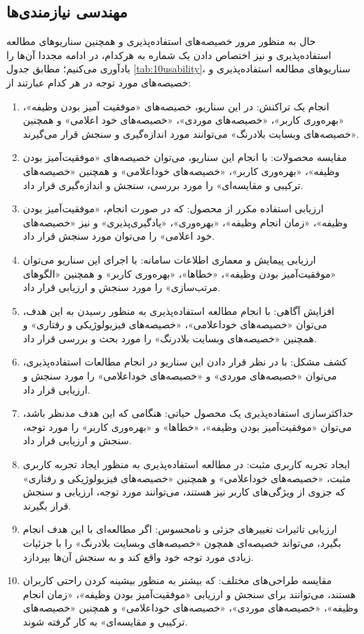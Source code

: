 \subsection{مهندسی نیازمندی‌ها}
حال به منظور مرور خصیصه‌های استفاده‌پذیری  و همچنین سناریوهای مطالعه استفاده‌پذیری و نیز اختصاص دادن یک شماره به هرکدام، در ادامه مجددا آن‌ها را یادآوری می‌کنیم؛ مطابق جدول
\ref{tab:10usability}،
سناریو‌های مطالعه استفاده‌پذیری و خصیصه‌های مورد توجه در هر کدام عبارتند از:
\begin{enumerate}
	\item
	انجام یک تراکنش: در این سناریو، خصیصه‌های «موفقیت آمیز بودن وظیفه»، «بهره‌وری کاربر»، «خصیصه‌های موردی»، «خصیصه‌های خود اعلامی» و همچنین «خصیصه‌های وبسایت بلادرنگ» می‌توانند مورد اندازه‌گیری و سنجش قرار می‌گیرند.
	\item
	مقایسه محصولات: با انجام این سناریو، می‌توان خصیصه‌های «موفقیت‌آمیز بودن وظیفه»، «بهره‌وری کاربر»، «خصیصه‌های خوداعلامی» و همچنین «خصیصه‌های ترکیبی و مقایسه‌ای» را مورد بررسی، سنجش و اندازه‌گیری قرار داد.
	\item
	ارزیابی استفاده مکرر از محصول: که در صورت انجام، «موفقیت‌آمیز بودن وظیفه»، «زمان انجام وظیفه»، «بهره‌وری»، «یادگیری‌پذیری» و نیز «خصیصه‌های خود اعلامی» را می‌توان مورد سنجش قرار داد.
	\item
	ارزیابی پیمایش و معماری اطلاعات سامانه: با اجرای این سناریو می‌توان «موفقیت‌آمیز بودن وظیفه»، «خطاها»، «بهره‌وری کاربر» و همچنین «الگوهای مرتب‌سازی» را مورد سنجش و ارزیابی قرار داد.
	\item
	افزایش آگاهی: با انجام مطالعه استفاده‌پذیری به منظور رسیدن به این هدف، می‌توان «خصیصه‌های خوداعلامی»، «خصیصه‌های فیزیولوژیکی و رفتاری» و همچنین «خصیصه‌های وبسایت‌ بلادرنگ» را مورد بحث و بررسی قرار داد.
	\item
	کشف مشکل: با در نظر قرار دادن این سناریو در انجام مطالعات استفاده‌پذیری، می‌توان «خصیصه‌های موردی» و «خصیصه‌های خوداعلامی» را مورد سنجش و ارزیابی قرار داد.
	\item 
	حداکثرسازی استفاده‌پذیری یک محصول حیاتی: هنگامی که این هدف مدنظر باشد، می‌توان «موفقیت‌آمیز بودن وظیفه»، «خطاها» و «بهره‌وری کاربر» را مورد توجه، سنجش و ارزیابی قرار داد.
	\item 
	ایجاد تجربه کاربری مثبت:
	در مطالعه استفاده‌پذیری به منظور ایجاد تجربه کاربری مثبت، «خصیصه‌های خوداعلامی» و همچنین «خصیصه‌های فیزیولوژیکی و رفتاری» که جزوی از ویژگی‌های کاربر نیز هستند، می‌توانند مورد توجه، ارزیابی و سنجش قرار بگیرند.
	\item 
	ارزیابی تاثیرات تغییرهای جزئی و نامحسوس: اگر مطالعه‌ای با این هدف انجام بگیرد، می‌تواند خصیصه‌ای همچون «خصیصه‌های وبسایت بلادرنگ» را با جزئیات زیادی مورد توجه خود واقع کند و به سنجش آن‌ها بپردازد.
	\item
	مقایسه طراحی‌های مختلف: که بیشتر به منظور بیشینه کردن راحتی کاربران هستند، می‌توانند برای سنجش و ارزیابی «موفقیت‌آمیز بودن وظیفه»‌، «زمان انجام وظیفه»، «خصیصه‌های موردی»، «خصیصه‌های خوداعلامی» و همچنین «خصیصه‌های ترکیبی و مقایسه‌ای» به کار گرفته شوند.
\end{enumerate}
